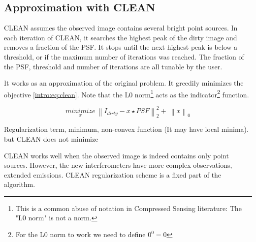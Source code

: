 \subsection{Approximation with CLEAN}
CLEAN assumes the observed image contains several bright point sources. In each iteration of CLEAN, it searches the highest peak of the dirty image and removes a fraction of the PSF. It stops until the next highest peak is below a threshold, or if the maximum number of iterations was reached. The fraction of the PSF, threshold and number of iterations are all tunable by the user.

It works as an approximation of the original problem. It greedily minimizes the objective \eqref{intro:eq:clean}. 
Note that the L0 norm\footnote{This is a common abuse of notation in Compressed Sensing literature: The "L0 norm" is not a norm.} acts as the indicator\footnote{For the L0 norm to work we need to define $0^0 = 0$} function.

\begin{equation}\label{intro:eq:clean}
\underset{x}{minimize} \: \left \| I_{dirty} - x \star PSF \right \|_2^2 + \: \left \| x \right \|_0
\end{equation}

Regularization term, minimum, non-convex function (It may have local minima). but CLEAN does not minimize

CLEAN works well when the observed image is indeed contains only point sources. However, the new interferometers have more complex observations, extended emissions. CLEAN regularization scheme is a fixed part of the algorithm. 



